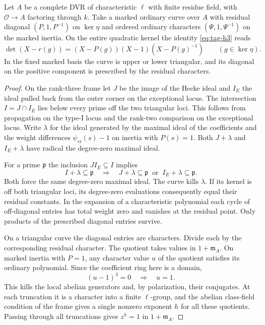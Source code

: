 \begin{proposition}\label{prop:marked-residual-polynomial}
Let \(A\) be a complete DVR of characteristic \(\ell\) with
finite residue field, with \(\mathcal O\to A\) factoring through
\(k\). Take a marked ordinary curve over \(A\) with residual diagonal
\((P,1,P^{-1})\) on \(\ker\eta\) and ordered ordinary characters
\((\Psi,1,\Psi^{-1})\) on the marked inertia. On the entire quadratic kernel the identity \eqref{eq:tag-h3} reads
\[
 \det(X-r(g))=(X-P(g))(X-1)(X-P(g)^{-1})\qquad(g\in\ker\eta).
\] In the
fixed marked basis the curve is upper or lower triangular,
and its diagonal on the positive component is prescribed
by the residual characters.
\end{proposition}

\begin{proof}
On the rank-three frame let \(J\) be the image of the Hecke
ideal and \(I_E\) the ideal pulled back from the outer corner
on the exceptional locus. The intersection \(I=J\cap I_E\)
lies below every prime off the two triangular loci. This follows
from propagation on the type-I locus and the rank-two comparison
on the exceptional locus. Write \(\lambda\) for the ideal
generated by the maximal ideal of the coefficients and the
weight differences \(\psi_{vi}(s)-1\) on inertia with \(P(s)=1\).
Both \(J+\lambda\) and \(I_E+\lambda\) have radical the
degree-zero maximal ideal.

For a prime \(\mathfrak p\) the inclusion \(JI_E\subseteq I\) implies
\[
 I+\lambda\subseteq\mathfrak p\quad\Longrightarrow\quad J+\lambda\subseteq\mathfrak p\ \text{ or }\ I_E+\lambda\subseteq\mathfrak p .
\]
Both force the same degree-zero maximal ideal.
The curve kills \(\lambda\). If its kernel is off both triangular
loci, its degree-zero evaluations consequently equal their
residual constants. In the expansion of a characteristic
polynomial each cycle of off-diagonal entries has total weight
zero and vanishes at the residual point. Only products of the
prescribed diagonal entries survive.

On a triangular curve the diagonal entries are characters.
Divide each by the corresponding residual character. The
quotient takes values in \(1+\mathfrak m_A\). On marked inertia with \(P=1\), any character value \(u\) of the quotient satisfies its ordinary polynomial. Since the coefficient ring here is a domain,
\[
 (u-1)^3=0\quad\Longrightarrow\quad u=1 .
\]
This kills the local abelian generators and, by polarization, their conjugates. At each truncation it is a
character into a finite \(\ell\)-group, and the abelian
class-field condition of the frame gives a single nonzero
exponent \(h\) for all these quotients. Passing through
all truncations gives \(z^h=1\) in \(1+\mathfrak m_A\).


\end{proof}
